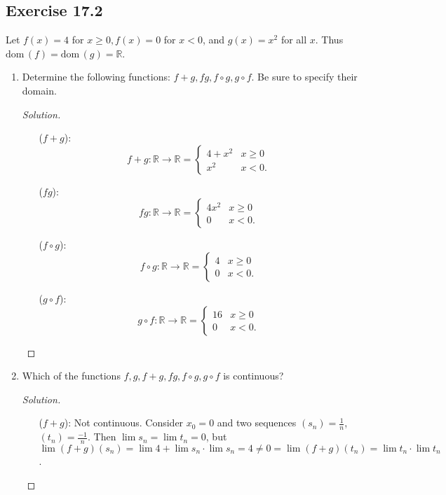 \documentclass{article}
\newcommand*{\dom}{\ensuremath{\mathrm{dom}}\,}
\newcommand*{\R}{\ensuremath{\mathbb{R}}}
\begin{document}
\subsection*{Exercise 17.2}
Let $f(x)=4$ for $x\ge 0, f(x)=0$ for $x<0$, and $g(x)=x^2$ for all $x$. Thus $\dom(f)=\dom(g)=\R$.
\begin{enumerate}[label=(\alph*)]
    \item Determine the following functions: $f+g, fg, f\circ g, g\circ f$. Be sure to specify their 
    domain.
    \begin{proof}[Solution]\indent 
        \begin{enumerate}
            \item [($f+g$):] $$f+g:\R\to\R=\begin{cases}
                4+x^2 & x\ge 0 \\
                x^2 & x<0.
            \end{cases}$$
            \item [($fg$):] $$fg:\R\to\R=\begin{cases}
                4x^2 & x\ge 0 \\
                0 & x<0.
            \end{cases}$$
            \item [($f\circ g$):] $$f\circ g:\R\to\R=\begin{cases}
                4 & x\ge 0 \\
                0 & x<0.
            \end{cases}$$
            \item [($g\circ f$):] $$g\circ f:\R\to\R=\begin{cases}
                16 & x\ge 0 \\
                0 & x<0.
            \end{cases}$$
        \end{enumerate}
    \end{proof}

    \item Which of the functions $f,g,f+g,fg,f\circ g, g\circ f$ is continuous?
    \begin{proof}[Solution]\indent 
        \begin{enumerate}
            \item [($f+g$):] Not continuous. Consider $x_0=0$ and two sequences 
            $(s_n)=\frac{1}{n}$, $(t_n)=\frac{-1}{n}$. Then $\lim s_n=\lim t_n=0$, but
            $\lim (f+g)(s_n)=\lim 4 + \lim s_n \cdot \lim s_n = 4\neq 0=\lim (f+g)(t_n) = \lim t_n 
            \cdot \lim t_n$.


\end{enumerate}
\end{proof}
\end{enumerate}
\end{document}
